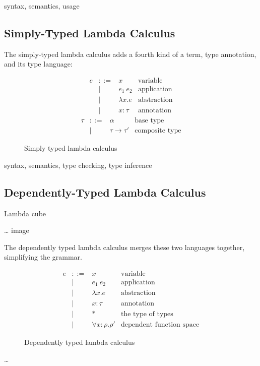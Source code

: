 \documentclass[english,zadani,odsaz]{fitthesis}
\begin{document}
syntax, semantics, usage

\subsection{Simply-Typed Lambda Calculus}
\label{sec:org16662a1}
The simply-typed lambda calculus adds a fourth kind of a term, type annotation,
and its type language:

\begin{figure}[!htpb]
\[\begin{array}{ccll}
e & ::= & x           & \text{variable} \\
  & |   & e_1~e_2      & \text{application} \\
  & |   & \lambda x. e & \text{abstraction} \\
  & |   & x:\tau     & \text{annotation}
\end{array}\]
\[\begin{array}{ccll}
\tau & ::= & \alpha           & \text{base type} \\
     & |   & \tau\rightarrow\tau' & \text{composite type}
\end{array}\]
\caption{Simply typed lambda calculus}
\end{figure}

syntax, semantics, type checking, type inference

\subsection{Dependently-Typed Lambda Calculus}
\label{sec:orgd3dc091}

Lambda cube

\ldots{} image

The dependently typed lambda calculus merges these two languages together,
simplifying the grammar.

\begin{figure}[!htpb]
\[\begin{array}{ccll}
e & ::= & x           & \text{variable} \\
  & |   & e_1~e_2      & \text{application} \\
  & |   & \lambda x. e & \text{abstraction} \\
  & |   & x:\tau      & \text{annotation} \\
  & |   & *           & \text{the type of types} \\
  & |   & \forall x:\rho.\rho' & \text{dependent function space}
\end{array}\]
\caption{Dependently typed lambda calculus}
\end{figure}
\ldots{}
\end{document}
